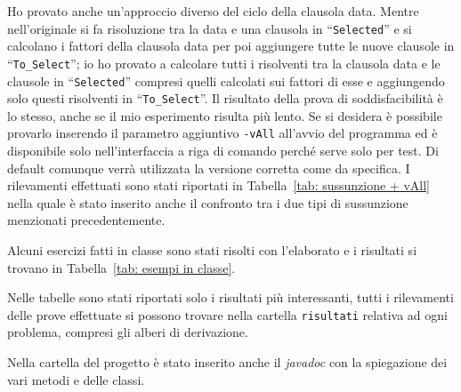 \documentclass[a4paper,11pt]{article} %
\newcommand{\sintassi}{\texttt}
\newcommand{\file}{\texttt}
\newcommand{\campo}{\texttt}
\begin{document}
Ho provato anche un'approccio diverso del ciclo della clausola data.
Mentre nell'originale si fa risoluzione tra la
data e una clausola in ``\campo{Selected}'' 
e si calcolano i fattori della clausola data
per poi aggiungere tutte le nuove clausole
in ``\campo{To\_Select}''; io ho provato a calcolare tutti i risolventi tra
la clausola data e le clausole in ``\campo{Selected}'' compresi quelli calcolati 
sui fattori di esse e aggiungendo solo questi risolventi in ``\campo{To\_Select}''.
Il risultato della prova di soddisfacibilità è lo stesso, anche se il mio esperimento
risulta più lento. Se si desidera è possibile provarlo inserendo
il parametro aggiuntivo \sintassi{-vAll} all'avvio del programma ed è 
disponibile solo nell'interfaccia a riga di comando perché serve solo per test.
Di default comunque verrà utilizzata la versione corretta come da specifica.
I rilevamenti effettuati sono stati riportati in Tabella~\ref{tab: sussunzione + vAll}
nella quale è stato inserito anche il confronto tra i due tipi di sussunzione
menzionati precedentemente.

Alcuni esercizi fatti in classe sono stati risolti con l'elaborato e i
risultati si trovano in Tabella~\ref{tab: esempi in classe}.

Nelle tabelle sono stati riportati solo i risultati più interessanti, 
tutti i rilevamenti delle prove effettuate si possono trovare nella 
cartella \file{risultati} relativa ad ogni problema, compresi %
gli alberi di derivazione.

Nella cartella del progetto è stato inserito anche il \emph{javadoc}
con la spiegazione dei vari metodi e delle classi.

\end{document}
